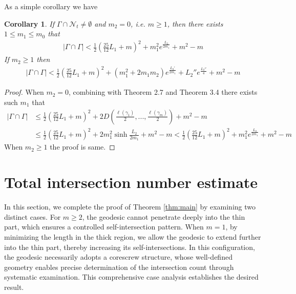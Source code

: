 \documentclass[11pt, a4paper]{article}
\newtheorem{cor}[thm]{Corollary}
\theoremstyle{definition}
\theoremstyle{remark}
\newcommand{\caln}{\mathcal{N}}
\newcommand{\abs}[1]{\left| #1 \right|}
\newcommand{\bracket}[1]{\left( #1 \right)}
\begin{document}
As a simple corollary we have

\begin{cor}\label{m_bigger2_1}
 If $\Gamma\cap\caln_t\neq\emptyset$ and $m_2=0$, i.e. $m\geqslant1$, then there exists $1\leqslant m_1\leqslant m_0$ that
\begin{align}\label{fff12}
\abs{\Gamma\cap\Gamma}<\frac12\bracket{\frac{25}{12}L_1+m}^2+m_1^2e^{\frac{L_2}{2m_1}}+m^2-m
\end{align}
If $m_2\geqslant1$ then
\begin{align}\label{fff12_1}
\abs{\Gamma\cap\Gamma}<\frac12\bracket{\frac{25}{12}L_1+m}^2+(m_1^2+2m_1m_2)e^{\frac{L_2'}{2m_1}}+{L_2''}e^{\frac{L_2''}4}+m^2-m
\end{align}
\end{cor}

\begin{proof}
 When $m_2=0$, combining with Theorem 2.7 and Theorem 3.4 there exists such $m_1$ that
\begin{align*}
\abs{\Gamma\cap\Gamma}&\leqslant\frac12\bracket{\frac{25}{12}L_1+m}^2+2D\bracket{\frac{\ell(\gamma_1)}2,...,\frac{\ell(\gamma_m)}2}+m^2-m\\
&\leqslant\frac12\bracket{\frac{25}{12}L_1+m}^2+2m_1^2\sinh\frac{L_2}{2m_1}+m^2-m<\frac12\bracket{\frac{25}{12}L_1+m}^2+m_1^2e^{\frac{L_2}{2m_1}}+m^2-m
\end{align*}
When $m_2\geqslant1$ the proof is same.
\end{proof}





























\section{Total intersection number estimate}\label{section5}

In this section, we complete the proof of Theorem \ref{thm:main} by examining two distinct cases. For $m \geq 2$, the geodesic cannot penetrate deeply into the thin part, which ensures a controlled self-intersection pattern. When $m = 1$, by minimizing the length in the thick region, we allow the geodesic to extend further into the thin part, thereby increasing its self-intersections. In this configuration, the geodesic necessarily adopts a corescrew structure, whose well-defined geometry enables precise determination of the intersection count through systematic examination. This comprehensive case analysis establishes the desired result.
\end{document}
